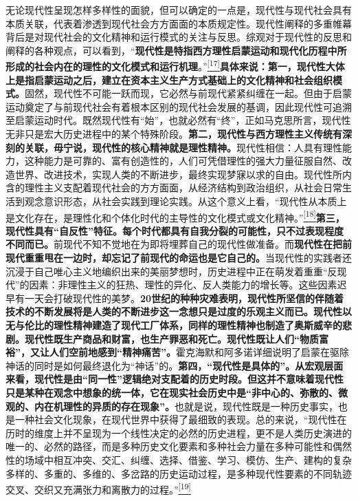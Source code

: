 \documentclass[UTF8, fontset = sourcesans, a4paper, oneside, zihao =
-4, scheme=chinese, no-math, space=true]{ctexbook}
\begin{document}
无论现代性呈现怎样多样性的面貌，但可以确定的一点是，现代性与现代社会具有本质关联，代表着渗透到现代社会方方面面的本质规定性。现代性阐释的多重帷幕背后是对现代社会的文化精神和运行模式的关注与反思。综观对于现代性的反思和阐释的各种观点，可以看到，``\textbf{现代性是特指西方理性启蒙运动和现代化历程中所形成的社会内在的理性的文化模式和运行机理}。''\protect\hypertarget{part0005_split_002.htmlux5cux23w17}{}{}\protect\hyperlink{part0005_split_003.htmlux5cux23m17}{\textsuperscript{{[}17{]}}}\textbf{具体来说：第一，现代性大体上是指启蒙运动之后，建立在资本主义生产方式基础上的文化精神和社会组织模式。}固然，现代性不可能一跃而现，它必然与前现代紧紧纠缠在一起。但由于启蒙运动奠定了与前现代社会有着根本区别的现代社会发展的基调，因此现代性可追溯至启蒙运动时代。既然现代性有``始''，也就必然有``终''，正如马克思所言，现代性无非只是宏大历史进程中的某个特殊阶段。\textbf{第二，现代性与西方理性主义传统有深刻的关联，毋宁说，现代性的核心精神就是理性精神。}现代性相信：人具有理性能力，这种能力是可靠的、富有创造性的，人们可凭借理性的强大力量征服自然、改造世界、改进技术，实现人类的不断进步，最终实现梦寐以求的自由。现代性所内含的理性主义支配着现代社会的方方面面，从经济结构到政治组织，从社会日常生活到观念意识形态，从社会实践到理论实践。从这个意义上看，``现代性从本质上是文化存在，是理性化和个体化时代的主导性的文化模式或文化精神。''\protect\hypertarget{part0005_split_002.htmlux5cux23w18}{}{}\protect\hyperlink{part0005_split_003.htmlux5cux23m18}{\textsuperscript{{[}18{]}}}\textbf{第三，现代性具有``自反性''特征。每个时代都具有自我分裂的可能性，只不过表现程度不同而已。}前现代不知不觉地在为即将埋葬自己的现代性做准备。而\textbf{现代性在把前现代重重甩在一边时，却忘记了前现代的命运也是它自己的。}当现代性的实践者还沉浸于自己唯心主义地编织出来的美丽梦想时，历史进程中正在萌发着重重``反现代''的因素：非理性主义的狂热、理性的异化、反人类能力的增长等。这些因素迟早有一天会打破现代性的美梦。\textbf{20世纪的种种灾难表明，现代性所坚信的伴随着技术的不断发展将是人类的不断进步这一念想只是过度的乐观主义而已。现代性以无与伦比的理性精神建造了现代工厂体系，同样的理性精神也制造了奥斯威辛的悲剧。现代性既生产商品和财富，也生产罪恶和死亡。现代性既让人们``物质富裕''，又让人们空前地感到``精神痛苦''。}霍克海默和阿多诺详细说明了启蒙在驱除神话的同时是如何最终退化为``神话''的。\textbf{第四，``现代性是具体的''。从宏观层面来看，现代性是由``同一性''逻辑绝对支配着的历史时段。但这并不意味着现代性只是某种在观念中想象的统一体，它在现实社会历史中是``非中心的、弥散的、微观的、内在机理性的异质的存在现象''。}也就是说，现代性既是一种历史事实，也是一种社会文化现象，在现代世界中获得了最细致的表现。总的来说，``现代性在历时的维度上并不呈现为一个线性决定的必然的历史进程，更不是人类历史演进的唯一的、必然的路径，而是多种历史文化要素和多种社会力量在多种可能性和偶然性的场域中相互冲突、交汇、纠缠、选择、借鉴、学习、模仿、生产、建构的复杂多样的、多重的、多维的、多岔路的历史运动过程，是多种现代性要素的不同轨迹交叉、交织又充满张力和离散力的过程。''\protect\hypertarget{part0005_split_002.htmlux5cux23w19}{}{}\protect\hyperlink{part0005_split_003.htmlux5cux23m19}{\textsuperscript{{[}19{]}}}
\end{document}
